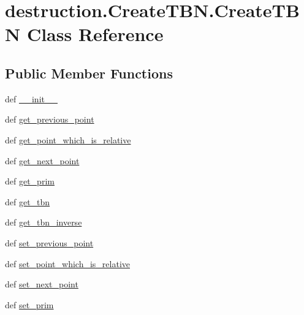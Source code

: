 \hypertarget{classdestruction_1_1_create_t_b_n_1_1_create_t_b_n}{\section{destruction.\-Create\-T\-B\-N.\-Create\-T\-B\-N Class Reference}
\label{classdestruction_1_1_create_t_b_n_1_1_create_t_b_n}
}
\subsection*{Public Member Functions}
\begin{DoxyCompactItemize}
\item 
def \hyperlink{classdestruction_1_1_create_t_b_n_1_1_create_t_b_n_a70d02209305249880b187bf23e62a7f5}{\-\_\-\-\_\-init\-\_\-\-\_\-}
\item 
def \hyperlink{classdestruction_1_1_create_t_b_n_1_1_create_t_b_n_aa39802c3b8f2d96ed95b656c18dae325}{get\-\_\-previous\-\_\-point}
\item 
def \hyperlink{classdestruction_1_1_create_t_b_n_1_1_create_t_b_n_adbb7093b16d4e258c7aac35018383fe8}{get\-\_\-point\-\_\-which\-\_\-is\-\_\-relative}
\item 
def \hyperlink{classdestruction_1_1_create_t_b_n_1_1_create_t_b_n_a76715d35a97c17a1cd9e3a4f182fde69}{get\-\_\-next\-\_\-point}
\item 
def \hyperlink{classdestruction_1_1_create_t_b_n_1_1_create_t_b_n_aeb18165c105b3e8be8315b3af25f5bbe}{get\-\_\-prim}
\item 
def \hyperlink{classdestruction_1_1_create_t_b_n_1_1_create_t_b_n_a7b2494ff6c01e256de108c6223bd5550}{get\-\_\-tbn}
\item 
def \hyperlink{classdestruction_1_1_create_t_b_n_1_1_create_t_b_n_a03638e3aeb3a3764e90dff3de9bc25b0}{get\-\_\-tbn\-\_\-inverse}
\item 
def \hyperlink{classdestruction_1_1_create_t_b_n_1_1_create_t_b_n_a0ea69b97f8317b3c2810ffe5c39f5d43}{set\-\_\-previous\-\_\-point}
\item 
def \hyperlink{classdestruction_1_1_create_t_b_n_1_1_create_t_b_n_ab6c4e5daa0b7a42354d76cb1c5c3a75a}{set\-\_\-point\-\_\-which\-\_\-is\-\_\-relative}
\item 
def \hyperlink{classdestruction_1_1_create_t_b_n_1_1_create_t_b_n_aa2f576aa09d81de8ed5322c1afe6e3c6}{set\-\_\-next\-\_\-point}
\item 
def \hyperlink{classdestruction_1_1_create_t_b_n_1_1_create_t_b_n_ac2ff19000aba2d733c0bdea31bd7ae2b}{set\-\_\-prim}

\end{DoxyCompactItemize}
